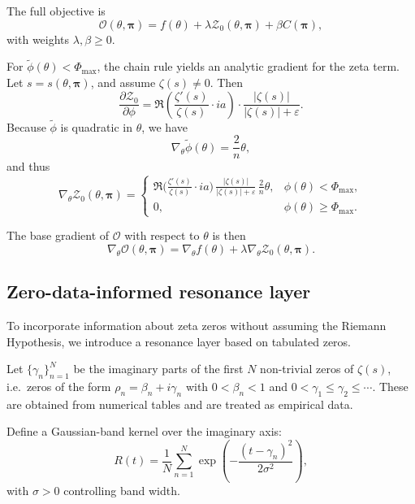 \documentclass[11pt]{article}
\begin{document}
The full objective is
\begin{equation}
  \mathcal{O}(\theta,\bm{\pi}) = f(\theta) + \lambda \mathcal{Z}_0(\theta,\bm{\pi}) + \beta C(\bm{\pi}),
  \label{eq:objective_base}
\end{equation}
with weights $\lambda,\beta \ge 0$.

For $\tilde{\phi}(\theta) < \Phi_{\max}$, the chain rule yields an analytic gradient for the zeta term. Let $s = s(\theta,\bm{\pi})$, and assume $\zeta(s)\neq 0$. Then
\[
  \frac{\partial \mathcal{Z}_0}{\partial \phi}
  = \Re\left(\frac{\zeta'(s)}{\zeta(s)} \cdot i a\right)\cdot \frac{|\zeta(s)|}{|\zeta(s)|+\varepsilon}.
\]
Because $\tilde{\phi}$ is quadratic in $\theta$, we have
\[
  \nabla_\theta \tilde{\phi}(\theta) = \frac{2}{n}\theta,
\]
and thus
\begin{equation}
  \nabla_\theta \mathcal{Z}_0(\theta,\bm{\pi}) =
  \begin{cases}
    \displaystyle
    \Re\Big(\frac{\zeta'(s)}{\zeta(s)} \cdot i a\Big)\,
    \frac{|\zeta(s)|}{|\zeta(s)|+\varepsilon}\,
    \frac{2}{n}\theta, & \phi(\theta) < \Phi_{\max}, \\[8pt]
    0, & \phi(\theta) \ge \Phi_{\max}.
  \end{cases}
  \label{eq:grad_zeta}
\end{equation}

The base gradient of $\mathcal{O}$ with respect to $\theta$ is then
\begin{equation}
  \nabla_\theta \mathcal{O}(\theta,\bm{\pi})
    = \nabla_\theta f(\theta) + \lambda \nabla_\theta \mathcal{Z}_0(\theta,\bm{\pi}).
  \label{eq:grad_objective_base}
\end{equation}

\subsection{Zero-data-informed resonance layer}

To incorporate information about zeta zeros without assuming the Riemann Hypothesis, we introduce a resonance layer based on tabulated zeros.

Let $\{\gamma_n\}_{n=1}^N$ be the imaginary parts of the first $N$ non-trivial zeros of $\zeta(s)$, i.e.\ zeros of the form $\rho_n = \beta_n + i\gamma_n$ with $0<\beta_n<1$ and $0<\gamma_1\le \gamma_2\le\cdots$. These are obtained from numerical tables and are treated as empirical data.

Define a Gaussian-band kernel over the imaginary axis:
\begin{equation}
  R(t) = \frac{1}{N} \sum_{n=1}^N \exp\left(-\frac{(t-\gamma_n)^2}{2\sigma^2}\right),
  \label{eq:kernel_R}
\end{equation}
with $\sigma>0$ controlling band width.
\end{document}
